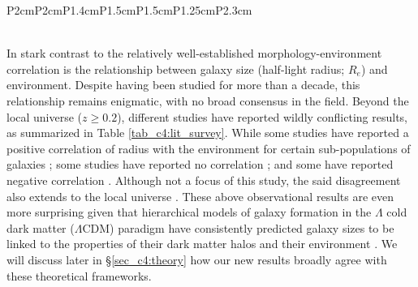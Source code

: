 \begin{table}[htbp]
\begin{tabular}{P{2cm}P{2cm}P{1.4cm}P{1.5cm}P{1.5cm}P{1.25cm}P{2.3cm}}
    \hline
    \hline
     \\
     \\
    \end{tabular}
\end{table}

In stark contrast to the relatively well-established morphology-environment correlation is the relationship between galaxy size (half-light radius; $R_e$) and environment. Despite having been studied for more than a decade, this relationship remains enigmatic, with no broad consensus in the field. Beyond the local universe ($z \geq 0.2$), different studies have reported wildly conflicting results, as summarized in Table \ref{tab_c4:lit_survey}. While some studies have reported a positive correlation of radius with the environment for certain sub-populations of galaxies \citep[e.g.,][]{Cooper12,Lani13,Bassett13,Afonso19,Siudek22}; some studies have reported no correlation \citep[e.g.,][]{Huertas-Company13, Kelkar15,Gu21}; and some have reported negative correlation \citep[e.g.,][]{Matharu19,Chan18}. Although not a focus of this study, the said disagreement also extends to the local universe \citep[e.g.,][]{Blanton05, Park07, Cappellari13, Huertas-Company13_local, Yoon17}. These above observational results are even more surprising given that hierarchical models of galaxy formation in the $\Lambda$ cold dark matter ($\Lambda$CDM) paradigm have consistently predicted galaxy sizes to be linked to the properties of their dark matter halos and their environment \citep[e.g.,][]{shankar13, Kravtsov13, somerville18, jiang19}. We will discuss later in \S \ref{sec_c4:theory} how our new results broadly agree with these theoretical frameworks. 

